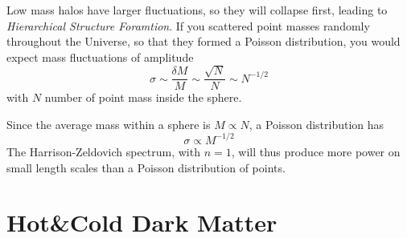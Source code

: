Low mass halos have larger fluctuations, so they will collapse first, leading to \emph{Hierarchical Structure Foramtion}. If you scattered point masses randomly throughout the Universe, so that they formed
a Poisson distribution, you would expect mass fluctuations of amplitude
\begin{equation*}
    \sigma \sim \frac{\delta M}{M}\sim \frac{\sqrt{N}}{N}\sim N^{-1/2}
\end{equation*}
with $N$ number of point mass inside the sphere.
\par Since the average mass within a sphere is $M\propto N$, a Poisson distribution has
\begin{equation*}
    \sigma \propto M^{-1/2}
\end{equation*}
The Harrison-Zeldovich spectrum, with $n=1$, will thus produce more power on small length scales than a Poisson distribution of points.

\section{Hot\&Cold Dark Matter}

